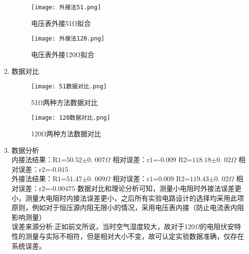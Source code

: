 \documentclass[dvipsnames, svgnames,a4paper,11pt]{article}
\begin{document}
\begin{enumerate}
			
				\begin{figure}[H]
					\centering
					\begin{minipage}[b]{0.4\linewidth}
						\centering
						\texttt{[image: 外接法51.png]}
						\caption{电压表外接51Ω拟合}
						\label{电压表外接51Ω拟合}
					\end{minipage}
					\hfill
					\begin{minipage}[b]{0.4\linewidth}
						\centering
						\texttt{[image: 外接法120.png]}
						\caption{电压表外接120Ω拟合}
						\label{电压表外接120Ω拟合}
					\end{minipage}
				\end{figure}
				\item 数据对比
				\begin{figure}[H]
					\centering
					\begin{minipage}[b]{0.45\linewidth}
						\centering
						\texttt{[image: 51数据对比.png]}
						\caption{51Ω两种方法数据对比}
						\label{51Ω两种方法数据对比}
					\end{minipage}\hfill
					\begin{minipage}[b]{0.45\linewidth}
						\centering
						\texttt{[image: 120数据对比.png]}
						\caption{120Ω两种方法数据对比}
						\label{120Ω两种方法数据对比}
					\end{minipage}
				\end{figure}
				\item 数据分析\\
				 内接法结果：$\text{R1=50.52±0. 007}\Omega $
				     \hspace{0.4cm}相对误差：$\text{r1=-0.009}$
				     \hspace{0.4cm}$\text{R2=118.18±0. 02}\Omega$
				     \hspace{0.4cm} 相对误差：$\text{r2=-0.015}$\\
				     外接法结果：$\text{R1=51.47±0. 009}\Omega $
				     \hspace{0.4cm} 相对误差：$\text{r1=0.009}$
				     \hspace{0.4cm}  $\text{R2=119.43±0. 02}\Omega $
				     \hspace{0.4cm}相对误差：$\text{r2=-0.00475}$
					 \indent 数据对比和理论分析可知，测量小电阻时外接法误差更小，测量大电阻时内接法误差更小，之后所有实验电路设计的选择均采用此项原则，例如对于恒压源内阻无限小的情况，采用电压表内接（防止电流表内阻影响测量）\\
					 \indent 误差来源分析:正如前文所说，当时空气湿度较大，故对于120$\Omega$的电阻伏安特性的测量与实际不相符，但是相对大小不变，故可认定实验数据准确，仅存在系统误差。
	\end{enumerate}
\end{document}
